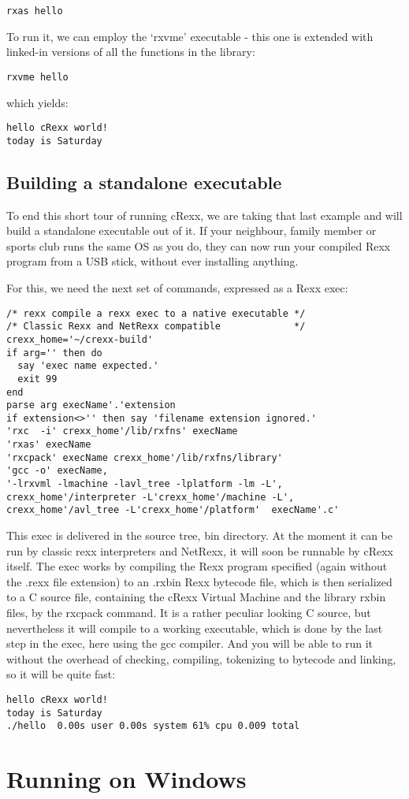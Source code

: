 \begin{verbatim}
rxas hello
\end{verbatim}

To run it, we can employ the `rxvme' executable - this one is extended
with linked-in versions of all the functions in the library:

\begin{verbatim}
rxvme hello
\end{verbatim}

which yields:

\begin{verbatim}
hello cRexx world!
today is Saturday
\end{verbatim}

\hypertarget{building-a-standalone-executable}{%
\section{Building a standalone
executable}\label{building-a-standalone-executable}}

To end this short tour of running cRexx, we are taking that last example
and will build a standalone executable out of it. If your neighbour,
family member or sports club runs the same OS as you do, they can now
run your compiled Rexx program from a USB stick, without ever installing
anything.

For this, we need the next set of commands, expressed as a Rexx exec:

\begin{verbatim}
/* rexx compile a rexx exec to a native executable */
/* Classic Rexx and NetRexx compatible             */
crexx_home='~/crexx-build'
if arg='' then do
  say 'exec name expected.'
  exit 99
end
parse arg execName'.'extension
if extension<>'' then say 'filename extension ignored.'
'rxc  -i' crexx_home'/lib/rxfns' execName
'rxas' execName
'rxcpack' execName crexx_home'/lib/rxfns/library'
'gcc -o' execName,
'-lrxvml -lmachine -lavl_tree -lplatform -lm -L',
crexx_home'/interpreter -L'crexx_home'/machine -L',
crexx_home'/avl_tree -L'crexx_home'/platform'  execName'.c'
\end{verbatim}

This exec is delivered in the source tree, bin directory. At the moment
it can be run by classic rexx interpreters and NetRexx, it will soon be
runnable by cRexx itself. The exec works by compiling the Rexx program
specified (again without the .rexx file extension) to an .rxbin Rexx
bytecode file, which is then serialized to a C source file, containing
the cRexx Virtual Machine and the library rxbin files, by the rxcpack
command. It is a rather peculiar looking C source, but nevertheless it
will compile to a working executable, which is done by the last step in
the exec, here using the gcc compiler. And you will be able to run it
without the overhead of checking, compiling, tokenizing to bytecode and
linking, so it will be quite fast:

\begin{verbatim}
hello cRexx world!
today is Saturday
./hello  0.00s user 0.00s system 61% cpu 0.009 total
\end{verbatim}

\chapter{Running \crexx{} on Windows}
